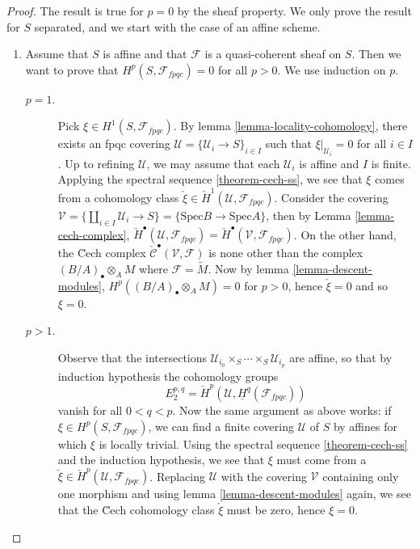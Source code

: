 \begin{proof}
The result is true for $p=0$ by the sheaf property. We only prove the result 
for $S$ separated, and we start with the case of an affine scheme.
\begin{enumerate}
\item
Assume that $S$ is affine and that $\mathcal{F}$ is a quasi-coherent sheaf on 
$S$. Then we want to prove that $H^p(S, \mathcal{F}_{fpqc}) = 0$ for all $p>0$. 
We use induction on $p$.
\begin{description}
\item[$p=1$.]
Pick $\xi \in H^1(S, \mathcal{F}_{fpqc})$. By lemma \ref{lemma-locality-cohomology}, 
there exists an fpqc covering $\mathcal{U} = \{ \mathcal{U}_i \to S \}_{i \in 
I}$ such that $\xi|_{\mathcal{U}_i} = 0$ for all $i \in I$. Up to refining 
$\mathcal{U}$, we may assume that each $\mathcal{U}_i$ is affine and $I$ is 
finite. Applying the spectral sequence \ref{theorem-cech-ss}, 
we see that $\xi$ comes from a cohomology class $\check{\xi} \in \check 
H^1(\mathcal{U}, \mathcal{F}_{fpqc})$. Consider the covering $\mathcal{V} = \{ 
\coprod_{i\in I} \mathcal{U}_i \to S\} = \{ \text{Spec} B \to \text{Spec} A 
\}$, then by
Lemma \ref{lemma-cech-complex},
$\check H^\bullet(\mathcal{U}, \mathcal{F}_{fpqc}) =
\check H^\bullet(\mathcal{V}, \mathcal{F}_{fpqc})$.
On the  other hand, the \u Cech complex
$\check{\mathcal{C}}^\bullet (\mathcal{V}, \mathcal{F})$
is none other than the complex $(B/A)_\bullet \otimes_A M$ where 
$\mathcal{F} = \widetilde{M}$. Now by lemma \ref{lemma-descent-modules}, 
$H^p((B/A)_\bullet \otimes_A M) = 0$ for $p>0$, hence $\check{\xi} = 0$ and so 
$\xi = 0$.
\item[$p>1$.]
Observe that the intersections $\mathcal{U}_{i_0} \times_S \cdots \times_S 
\mathcal{U}_{i_p}$ are affine, so that by induction hypothesis the cohomology 
groups 
$$
E_2^{p,q} = \check H^p(\mathcal{U}, \underline{H}^q (\mathcal{F}_{fpqc}))
$$ 
vanish for all $0 < q < p$. Now the same argument as above works: if $\xi \in 
H^p(S, \mathcal{F}_{fpqc})$, we can find a finite covering $\mathcal{U}$ of $S$ 
by affines for which $\xi$ is locally trivial. Using the spectral sequence 
\ref{theorem-cech-ss} and the induction hypothesis, we see that 
$\xi$ must come from a $\check{\xi} \in \check H^p(\mathcal{U}, 
\mathcal{F}_{fpqc})$. Replacing $\mathcal{U}$ with the covering $\mathcal{V}$ 
containing only one morphism and using lemma \ref{lemma-descent-modules} again, 
we see that the \u Cech cohomology class $\check{\xi}$ must be zero, hence $\xi 
= 0$.

\end{description}
\end{enumerate}
\end{proof}
